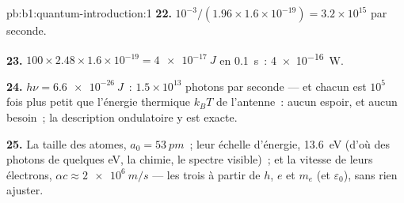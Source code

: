 \begin{solution}{pb:b1:quantum-introduction:1}
\textbf{22.} $10^{-3}/(1.96 \times 1.6 \times 10^{-19}) = 3.2 \times 10^{15}$ par seconde.

\textbf{23.} $100 \times 2.48 \times 1.6 \times 10^{-19} = \qty{4e-17}{J}$ en \qty{0.1}{s}~:
\qty{4e-16}{W}.

\textbf{24.} $h\nu = \qty{6.6e-26}{J}$~: $1.5 \times 10^{13}$ photons par seconde ---
et chacun est $10^5$ fois plus petit que l'énergie thermique $k_BT$ de
l'antenne~: aucun espoir, et aucun besoin~; la description ondulatoire y est exacte.

\textbf{25.} La taille des atomes, $a_0 = \qty{53}{pm}$~; leur échelle d'énergie,
\qty{13.6}{eV} (d'où des photons de quelques eV, la chimie, le spectre
visible)~; et la vitesse de leurs électrons, $\alpha c \approx \qty{2e6}{m/s}$ ---
les trois à partir de $h$, $e$ et $m_e$ (et $\varepsilon_0$), sans rien ajuster.
\end{solution}
